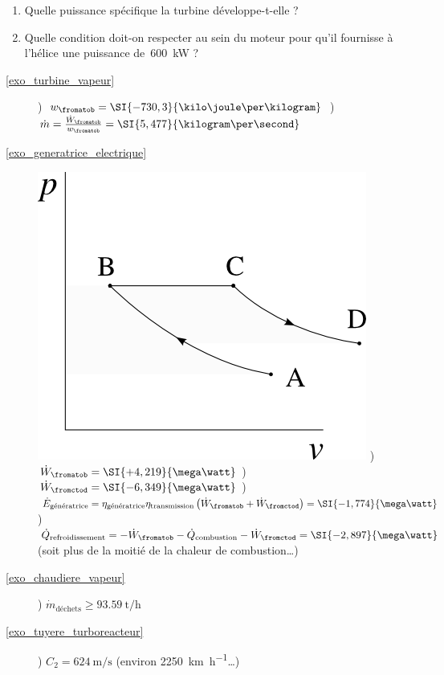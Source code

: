 	\begin{enumerate}
		\item Quelle puissance spécifique la turbine développe-t-elle ?
		\item Quelle condition doit-on respecter au sein du moteur pour qu’il fournisse à l’hélice une puissance de~\SI{600}{\kilo\watt} ?
	\end{enumerate}

\exercisesolutionpage
\titreresultats

\begin{description}
	\item [\ref{exo_turbine_vapeur}]
					) $w_\fromatob = \SI{-730,3}{\kilo\joule\per\kilogram}$
					) $\dot m = \frac{\dot{W}_\fromatob}{w_\fromatob} = \SI{5,477}{\kilogram\per\second}$
	\item [\ref{exo_generatrice_electrique}]
					\includegraphics[width=\solutiondiagramwidth]{images/exo_sol_pv_1.png}
					) $\dot{W}_\fromatob = \SI{+4,219}{\mega\watt}$
					) $\dot{W}_\fromctod = \SI{-6,349}{\mega\watt}$
					) $\dot{E}_\text{génératrice} = \eta_\text{génératrice} \eta_\text{transmission} \left(\dot{W}_\fromatob + \dot{W}_\fromctod\right) = \SI{-1,774}{\mega\watt}$
					) $\dot{Q}_\text{refroidissement} = - \dot{W}_\fromatob - \dot{Q}_\text{combustion} - \dot{W}_\fromctod = \SI{-2,897}{\mega\watt}$ (soit plus de la moitié de la chaleur de combustion…)
	\item [\ref{exo_chaudiere_vapeur}]
					) $\dot{m}_\text{déchets} \geq \SI{93,59}{\tonne\per\hour}$
	\item [\ref{exo_tuyere_turboreacteur}]
					) $C_2 = \SI{624}{\metre\per\second}$ (environ \SI[per-mode=symbol]{2250}{\kilo\metre\per\hour}…)

\end{description}
